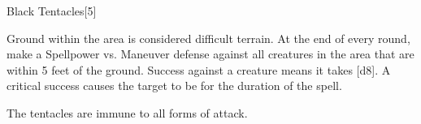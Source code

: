\begin{spellsection}{Black Tentacles}[5]
    \begin{spellheader}
    \end{spellheader}
    \begin{spellcontent}
        \begin{spelltargetinginfo}
        \end{spelltargetinginfo}
        \begin{spelleffects}
            \spelleffect Ground within the area is considered difficult terrain. At the end of every round, make a Spellpower vs. Maneuver defense against all creatures in the area that are within 5 feet of the ground. Success against a creature means it takes [d8]. A critical success causes the target to be \immobilized for the duration of the spell.
            \spelldur \durshort
        \end{spelleffects}
    \end{spellcontent}
    \begin{spellfooter}
        \spellnotes The tentacles are immune to all forms of attack.
        \miscastyou
    \end{spellfooter}
\end{spellsection}

